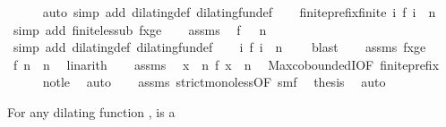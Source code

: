 \begin{isabellebody}
\ \ \ \ \isamarkupfalse%
\ {\isacharparenleft}auto\ simp\ add{\isacharcolon}\ dilating{\isacharunderscore}def\ dilating{\isacharunderscore}fun{\isacharunderscore}def{\isacharparenright}\isanewline
\ \ \isamarkupfalse%
\ finite{\isacharunderscore}prefix{\isacharcolon}{\isacartoucheopen}finite\ {\isacharbraceleft}i{\isachardot}\ f\ i\ {\isasymle}\ n{\isacharbraceright}{\isacartoucheclose}\ \isamarkupfalse%
\ {\isacharparenleft}simp\ add{\isacharcolon}\ finite{\isacharunderscore}less{\isacharunderscore}ub\ fxge{\isacharparenright}\isanewline
\ \ \isamarkupfalse%
\ assms{\isacharparenleft}{}{\isacharparenright}\ \isamarkupfalse%
\ {\isacartoucheopen}f\ {}\ {\isasymle}\ n{\isacartoucheclose}\ \isamarkupfalse%
\ {\isacharparenleft}simp\ add{\isacharcolon}\ dilating{\isacharunderscore}def\ dilating{\isacharunderscore}fun{\isacharunderscore}def{\isacharparenright}\isanewline
\ \ \isamarkupfalse%
\ {\isacartoucheopen}{\isacharbraceleft}i{\isachardot}\ f\ i\ {\isasymle}\ n{\isacharbraceright}\ {\isasymnoteq}\ {\isacharbraceleft}{\isacharbraceright}{\isacartoucheclose}\ \isamarkupfalse%
\ blast\isanewline
\ \ \isamarkupfalse%
\ assms{\isacharparenleft}{}{\isacharparenright}\ fxge\ \isamarkupfalse%
\ {\isacartoucheopen}f\ n\ {\isacharless}\ n{\isacartoucheclose}\ \isamarkupfalse%
\ linarith\isanewline
\ \ \isamarkupfalse%
\ assms{\isacharparenleft}{}{\isacharparenright}\ \isamarkupfalse%
\ {\isacartoucheopen}{\isasymforall}x\ {\isachargreater}\ n\ f\ x\ {\isachargreater}\ n{\isacartoucheclose}\ \isamarkupfalse%
\ Max{\isachardot}coboundedI{\isacharbrackleft}OF\ finite{\isacharunderscore}prefix{\isacharbrackright}\isanewline
\ \ \ \ \isamarkupfalse%
\ not{\isacharunderscore}le\ \isamarkupfalse%
\ auto\isanewline
\ \ \isamarkupfalse%
\ assms{\isacharparenleft}{}{\isacharparenright}\ strict{\isacharunderscore}mono{\isacharunderscore}less{\isacharbrackleft}OF\ smf{\isacharbrackright}\ \isamarkupfalse%
\ {\isacharquery}thesis\ \isamarkupfalse%
\ auto\isanewline
{}\isamarkupfalse%
%
\endisatagproof
{\isafoldproof}%
%
\isadelimproof
%
\endisadelimproof
%
\begin{isamarkuptext}%
For any dilating function ,  is a 

\end{isamarkuptext}
\end{isabellebody}
